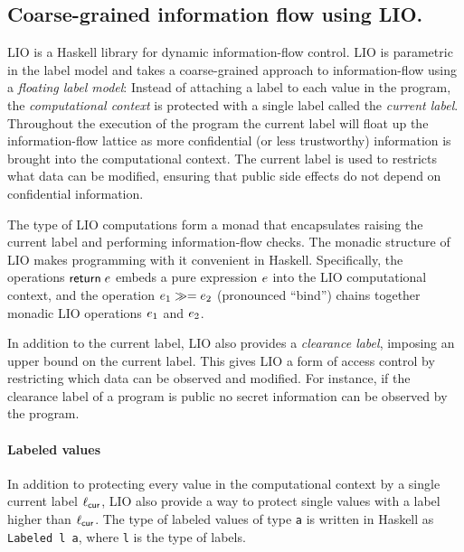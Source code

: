 \subsection{Coarse-grained information flow using LIO.}
LIO \cite{SRMMlio} is a Haskell library for dynamic information-flow control. LIO is parametric in the label model and takes a coarse-grained approach to information-flow using a \emph{floating label model}: Instead of attaching a label to each value in the program, the \emph{computational context} is protected with a single label called the \emph{current label}. Throughout the execution of the program the current label will float up the information-flow lattice as more confidential (or less trustworthy) information is brought into the computational context. The current label is used to restricts what data can be modified, ensuring that public side effects do not depend on confidential information.

The type of LIO computations form a monad \cite{Wadler:1995:MFP:647698.734146} that encapsulates raising the current label and performing information-flow checks. The monadic structure of LIO makes programming with it convenient in Haskell. Specifically, the operations $\mathsf{return}\;e$ embeds a pure expression $e$ into the LIO computational context, and the operation $e_1 \gg= e_2$ (pronounced ``bind'') chains together monadic LIO operations $e_1$ and $e_2$.

In addition to the current label, LIO also provides a \emph{clearance label}, imposing an upper bound on the current label. This gives LIO a form of access control by restricting which data can be observed and modified. For instance, if the clearance label of a program is public no secret information can be observed by the program.

\paragraph{Labeled values}
In addition to protecting every value in the computational context by a single current label $\ell_{\mathsf{cur}}$, LIO also provide a way to protect single values with a label higher than $\ell_{\mathsf{cur}}$. The type of labeled values of type \texttt{a} is written in Haskell as \texttt{Labeled l a}, where \texttt{l} is the type of labels.

